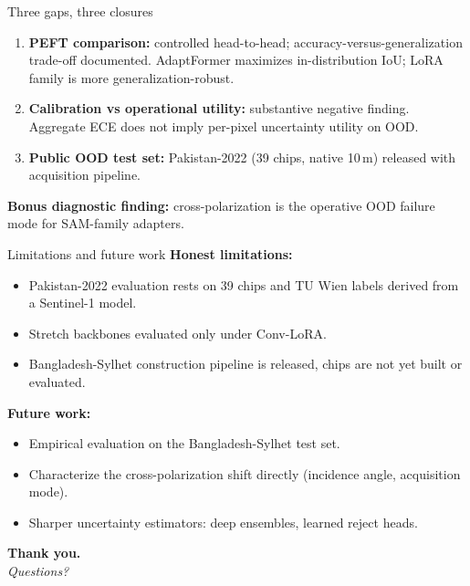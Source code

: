 \documentclass[aspectratio=169,11pt]{beamer}
\begin{document}
\begin{frame}{Three gaps, three closures}
\begin{enumerate}
    \item[\textbf{1.}] \textbf{PEFT comparison:} controlled head-to-head; accuracy-versus-generalization trade-off documented. AdaptFormer maximizes in-distribution IoU; LoRA family is more generalization-robust.
    \vspace{0.6em}
    \item[\textbf{2.}] \textbf{Calibration vs operational utility:} substantive negative finding. Aggregate ECE does not imply per-pixel uncertainty utility on OOD.
    \vspace{0.6em}
    \item[\textbf{3.}] \textbf{Public OOD test set:} Pakistan-2022 (39 chips, native 10\,m) released with acquisition pipeline.
\end{enumerate}
\vspace{0.6em}
\textbf{Bonus diagnostic finding:} cross-polarization is the operative OOD failure mode for SAM-family adapters.
\end{frame}

\begin{frame}{Limitations and future work}
\textbf{Honest limitations:}
\begin{itemize}
    \item Pakistan-2022 evaluation rests on 39 chips and TU Wien labels derived from a Sentinel-1 model.
    \item Stretch backbones evaluated only under Conv-LoRA.
    \item Bangladesh-Sylhet construction pipeline is released, chips are not yet built or evaluated.
\end{itemize}

\textbf{Future work:}
\begin{itemize}
    \item Empirical evaluation on the Bangladesh-Sylhet test set.
    \item Characterize the cross-polarization shift directly (incidence angle, acquisition mode).
    \item Sharper uncertainty estimators: deep ensembles, learned reject heads.
\end{itemize}
\vspace{0.6em}
\begin{center}
\Large \textbf{Thank you.}\\
\small \emph{Questions?}
\end{center}
\end{frame}
\end{document}
